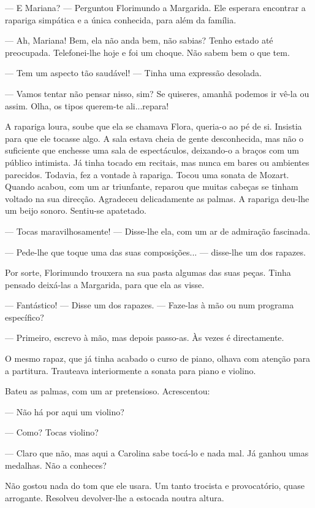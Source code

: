 --- E Mariana? --- Perguntou Florimundo a Margarida. Ele esperara encontrar
a rapariga simpática e a única conhecida, para além da família.

--- Ah, Mariana! Bem, ela não anda bem, não sabias? Tenho estado até
preocupada. Telefonei-lhe hoje e foi um choque. Não sabem bem o que tem.

--- Tem um aspecto tão saudável! --- Tinha uma expressão desolada.

--- Vamos tentar não pensar nisso, sim? Se quiseres, amanhã podemos ir
vê-la ou assim. Olha, os tipos querem-te ali...repara!

A rapariga loura, soube que ela se chamava Flora, queria-o ao pé de si.
Insistia para que ele tocasse algo. A sala estava cheia de gente
desconhecida, mas não o suficiente que enchesse uma sala de
espectáculos, deixando-o a braços com um público intimista. Já tinha
tocado em recitais, mas nunca em bares ou ambientes parecidos. Todavia,
fez a vontade à rapariga. Tocou uma sonata de Mozart. Quando acabou, com
um ar triunfante, reparou que muitas cabeças se tinham voltado na sua
direcção. Agradeceu delicadamente as palmas. A rapariga deu-lhe um beijo
sonoro. Sentiu-se apatetado.

--- Tocas maravilhosamente! --- Disse-lhe ela, com um ar de admiração
fascinada.

--- Pede-lhe que toque uma das suas composições... --- disse-lhe um dos
rapazes.

Por sorte, Florimundo trouxera na sua pasta algumas das suas peças.
Tinha pensado deixá-las a Margarida, para que ela as visse.

--- Fantástico! --- Disse um dos rapazes. --- Faze-las à mão ou num programa
específico?

--- Primeiro, escrevo à mão, mas depois passo-as. Às vezes é directamente.

O mesmo rapaz, que já tinha acabado o curso de piano, olhava com atenção
para a partitura. Trauteava interiormente a sonata para piano e violino.

Bateu as palmas, com um ar pretensioso. Acrescentou:

--- Não há por aqui um violino?

--- Como? Tocas violino?

--- Claro que não, mas aqui a Carolina sabe tocá-lo e nada mal. Já ganhou
umas medalhas. Não a conheces?

Não gostou nada do tom que ele usara. Um tanto trocista e provocatório,
quase arrogante. Resolveu devolver-lhe a estocada noutra altura.

